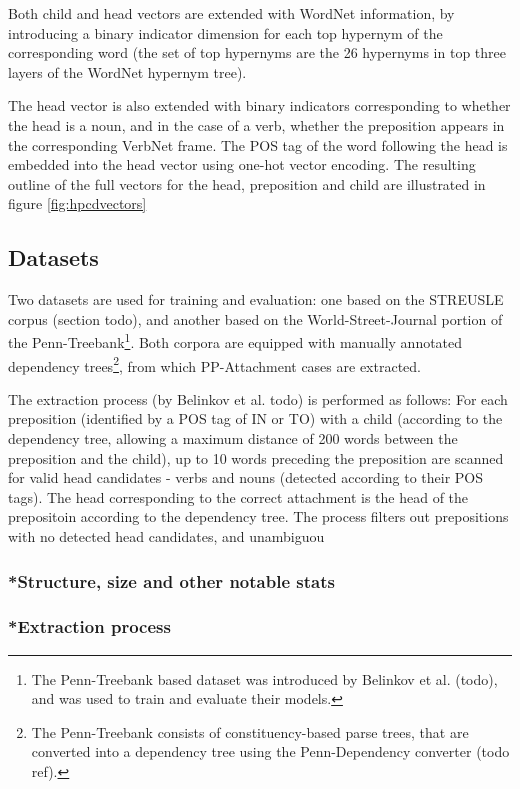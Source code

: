 Both child and head vectors are extended with WordNet information, by introducing a binary indicator dimension for each top hypernym of the corresponding word (the set of top hypernyms are the 26 hypernyms in top three layers of the WordNet hypernym tree). 

The head vector is also extended with binary indicators corresponding to whether the head is a noun, and in the case of a verb, whether the preposition appears in the corresponding VerbNet frame. The POS tag of the word following the head is embedded into the head vector using one-hot vector encoding. The resulting outline of the full vectors for the head, preposition and child are illustrated in figure \ref{fig:hpcdvectors}

\subsection{Datasets}

Two datasets are used for training and evaluation: one based on the STREUSLE corpus (section todo), and another based on the World-Street-Journal portion of the Penn-Treebank\footnote{The Penn-Treebank based dataset was introduced by Belinkov et al. (todo), and was used to train and evaluate their models.}. Both corpora are equipped with manually annotated dependency trees\footnote{The Penn-Treebank consists of constituency-based parse trees, that are converted into a dependency tree using the Penn-Dependency converter (todo ref).}, from which PP-Attachment cases are extracted. 

The extraction process (by Belinkov et al. todo) is performed as follows: For each preposition (identified by a POS tag of IN or TO) with a child (according to the dependency tree, allowing a maximum distance of 200 words between the preposition and the child), up to 10 words preceding the preposition are scanned for valid head candidates - verbs and nouns (detected according to their POS tags). The head corresponding to the correct attachment is the head of the prepositoin according to the dependency tree. The process filters out prepositions with no detected head candidates, and unambiguou

\subsubsection{*Structure, size and other notable stats}
\subsubsection{*Extraction process}

